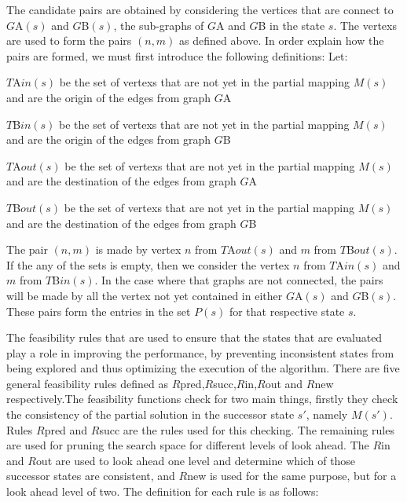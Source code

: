  The candidate pairs are obtained by considering the vertices that are connect to $G${\tiny A}$(s)$ and $G${\tiny B}$(s)$, the sub-graphs of $G${\tiny A} and $G${\tiny B} in the state $s$. The vertexs are used to form the pairs $(n,m)$ as defined above. In order explain how the pairs are formed, we must first introduce the following definitions:\newline
Let:
\begin{myEnumerate}
\item $T${\tiny A}$in(s)$ be the set of vertexs that are not yet in the partial mapping $M(s)$ and are the origin \quad of the edges from graph $G${\tiny A}
\item $T${\tiny B}$in(s)$ be the set of vertexs that are not yet in the partial mapping $M(s)$ and are the origin of the edges from graph $G${\tiny B}
\item $T${\tiny A}$out(s)$ be the set of vertexs that are not yet in the partial mapping $M(s)$ and are the destination of the edges from graph $G${\tiny A}
\item $T${\tiny B}$out(s)$ be the set of vertexs that are not yet in the partial mapping $M(s)$ and are the destination of the edges from graph $G${\tiny B}
\end{myEnumerate}

The pair $(n,m)$ is made by vertex $n$ from $T${\tiny A}$out(s)$ and $m$ from $T${\tiny B}$out(s)$. If the any of the sets is empty, then we consider the vertex $n$ from $T${\tiny A}$in(s)$ and $m$ from $T${\tiny B}$in(s)$. In the case where that graphs are not connected, the pairs will be made by all the vertex not yet contained in either $G${\tiny A}$(s)$ and $G${\tiny B}$(s)$. These pairs form the entries in the set $P(s)$ for that respective state $s$.

The feasibility rules that are used to ensure that the states that are evaluated play a role in improving the performance, by preventing inconsistent states from being explored and thus optimizing the execution of the algorithm. There are five general feasibility rules defined as $R${\tiny pred},$R${\tiny succ},$R${\tiny in},$R${\tiny out} and $R${\tiny new} respectively.\newline\newline The feasibility functions check for two main things, firstly they check the consistency of the partial solution in the successor state $s'$, namely $M(s')$. Rules $R${\tiny pred} and $R${\tiny succ} are the rules used for this checking.\newline
The remaining rules are used for pruning the search space for different levels of look ahead. The $R${\tiny in} and $R${\tiny out} are used to look ahead one level and determine which of those successor states are consistent, and $R${\tiny new} is used for the same purpose, but for a look ahead level of two. The definition for each rule is as follows:


